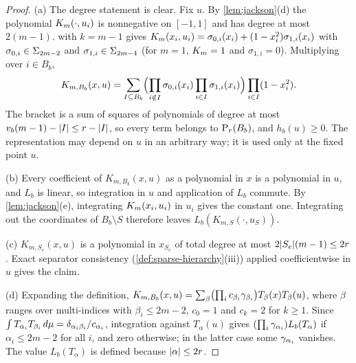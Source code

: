 \begin{proof}
(a) The degree statement is clear. Fix $u$. By \cref{lem:jackson}(d) the
polynomial $K_m(\cdot,u_i)$ is nonnegative on $[-1,1]$ and has degree at
most $2(m-1)$.  with $k=m-1$ gives
$K_m(x_i,u_i)=\sigma_{0,i}(x_i)+(1-x_i^2)\sigma_{1,i}(x_i)$ with
$\sigma_{0,i}\in\Sigma_{2m-2}$ and $\sigma_{1,i}\in\Sigma_{2m-4}$ (for $m=1$,
$K_m=1$ and $\sigma_{1,i}=0$). Multiplying over $i\in B_b$,
\[
  K_{m,B_b}(x,u)=\sum_{I\subseteq B_b}
  \Bigl(\prod_{i\notin I}\sigma_{0,i}(x_i)\prod_{i\in I}\sigma_{1,i}(x_i)\Bigr)
  \prod_{i\in I}(1-x_i^2).
\]
The bracket is a sum of squares of polynomials of degree at most
$v_b(m-1)-\lvert I\rvert\le r-\lvert I\rvert$, so every term belongs to
$\mathrm{P}_r(B_b)$, and $h_b(u)\ge0$. The representation may depend on $u$ in an
arbitrary way; it is used only at the fixed point $u$.

(b) Every coefficient of $K_{m,B_b}(x,u)$ as a polynomial in $x$ is a
polynomial in $u$, and $L_b$ is linear, so integration in $u$ and
application of $L_b$ commute. By \cref{lem:jackson}(e), integrating
$K_m(x_i,u_i)$ in $u_i$ gives the constant one. Integrating out the
coordinates of $B_b\setminus S$ therefore leaves $L_b(K_{m,S}(\cdot,u_S))$.

(c) $K_{m,S_e}(x,u)$ is a polynomial in $x_{S_e}$ of total degree at most
$2\lvert S_e\rvert(m-1)\le2r$. Exact separator consistency
(\cref{def:sparse-hierarchy}(iii)) applied coefficientwise in $u$ gives the
claim.

(d) Expanding the definition, $K_{m,B_b}(x,u)=\sum_\beta
\bigl(\prod_ic_{\beta_i}\gamma_{\beta_i}\bigr)T_\beta(x)T_\beta(u)$, where
$\beta$ ranges over multi-indices with $\beta_i\le2m-2$, $c_0=1$ and
$c_k=2$ for $k\ge1$. Since $\int T_{\alpha_i}T_{\beta_i}\,d\mu=
\delta_{\alpha_i\beta_i}/c_{\alpha_i}$, integration against $T_\alpha(u)$
gives $(\prod_i\gamma_{\alpha_i})L_b(T_\alpha)$ if $\alpha_i\le2m-2$ for
all $i$, and zero otherwise; in the latter case some $\gamma_{\alpha_i}$
vanishes. The value $L_b(T_\alpha)$ is defined because $\lvert \alpha\rvert\le2r$.
\end{proof}

